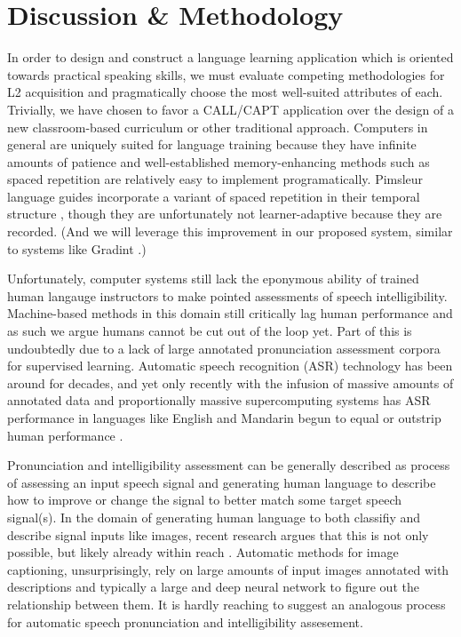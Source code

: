 \section{Discussion \& Methodology} 
In order to design and construct a language learning application which is oriented towards practical speaking skills, we must evaluate competing methodologies for L2 acquisition and pragmatically choose the most well-suited attributes of each. Trivially, we have chosen to favor a CALL/CAPT application over the design of a new classroom-based curriculum or other traditional approach. Computers in general are uniquely suited for language training because they have infinite amounts of patience and well-established memory-enhancing methods such as spaced repetition \cite{glanzer1971repetition} \cite{wozniak2007supermemo} \cite{wozniak1990supermemo} \cite{cuddy1982forgetting} are relatively easy to implement programatically. Pimsleur language guides incorporate a variant of spaced repetition in their temporal structure \cite{pimsleur2013learn}, though they are unfortunately not learner-adaptive because they are recorded. (And we will leverage this improvement in our proposed system, similar to systems like Gradint \cite{gradint}.) 

Unfortunately, computer systems still lack the eponymous ability of trained human langauge instructors to make pointed assessments of speech intelligibility. Machine-based methods in this domain still critically lag human performance and as such we argue humans cannot be cut out of the loop yet. Part of this is undoubtedly due to a lack of large annotated pronunciation assessment corpora for supervised learning. Automatic speech recognition (ASR) technology has been around for decades, and yet only recently with the infusion of massive amounts of annotated data and proportionally massive supercomputing systems has ASR performance in languages like English and Mandarin begun to equal or outstrip human performance \cite{hannun2014deep} \cite{hinton2012deep} \cite{chan2016listen}. 

Pronunciation and intelligibility assessment can be generally described as process of assessing an input speech signal and generating human language to describe how to improve or change the signal to better match some target speech signal(s). In the domain of generating human language to both classifiy and describe signal inputs like images, recent research argues that this is not only possible, but likely already within reach \cite{reed2016learning} \cite{tran2016rich}. Automatic methods for image captioning, unsurprisingly, rely on large amounts of input images annotated with descriptions and typically a large and deep neural network to figure out the relationship between them. It is hardly reaching to suggest an analogous process for automatic speech pronunciation and intelligibility assesement. 

